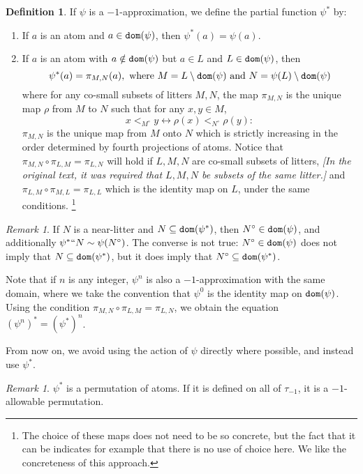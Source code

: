 \documentclass[112pt]{article}
\theoremstyle{definition}
\newtheorem{definition}[theorem]{Definition}
\theoremstyle{remark}
\newtheorem{remark}[theorem]{Remark}
\newcommand{\rk}[1]{{\color{blue}\sl #1}}
\begin{document}
\begin{definition}
  If $\psi$ is a $-1$-approximation, we define the partial function $\psi^*$ by:
  \begin{enumerate}
    \item If $a$ is an atom and $a \in {\tt dom}(\psi)$, then $\psi^*(a) = \psi(a)$.
    \item If $a$ is an atom with $a \notin {\tt dom}(\psi)$ but $a \in L$ and $L \in {\tt dom}(\psi)$, then
    $$ \psi^*(a) = \pi_{M, N}(a),\ \mathrm{where}\ M = L \setminus {\tt dom}(\psi) \ \mathrm{and}\ N = \psi(L) \setminus {\tt dom}(\psi) $$
    where for any co-small subsets of litters $M, N$, the map $\pi_{M,N}$ is the unique map $\rho$ from $M$ to $N$ such that for any $x, y \in M$,
    $$x <_{M^{\circ}} y \leftrightarrow \rho(x) <_{N^\circ} \rho(y):$$
    $\pi_{M,N}$ is the unique map from $M$ onto $N$ which is strictly increasing in the order determined by fourth projections of atoms.  Notice that $ \pi_{M,N} \circ \pi_{L,M} = \pi_{L,N}$ will hold if $L,M,N$ are co-small subsets of litters, \rk{[In the original text, it was required that $L,M,N$ be subsets of the same litter.]} and $\pi_{L,M} \circ \pi_{M,L} = \pi_{L,L}$ which is the identity map on $L$, under the same conditions.%
    \footnote{The choice of these maps does not need to be so concrete, but the fact that it can be indicates for example that there is no use of choice here.  We like the concreteness of this approach.}
  \end{enumerate}
\end{definition}
\begin{remark}
  If $N$ is a near-litter and $N \subseteq {\tt dom}(\psi^*)$, then $N^\circ \in {\tt dom}(\psi)$, and additionally $\psi^* `` N \sim \psi(N^\circ)$.
  The converse is not true: $N^\circ \in {\tt dom}(\psi)$ does not imply that $N \subseteq {\tt dom}(\psi^*)$, but it does imply that $N^\circ \subseteq {\tt dom}(\psi^*)$.

  Note that if $n$ is any integer, $\psi^n$ is also a $-1$-approximation with the same domain, where we take the convention that $\psi^0$ is the identity map on ${\tt dom}(\psi)$.
  Using the condition $\pi_{M,N} \circ \pi_{L,M} = \pi_{L,N}$, we obtain the equation $(\psi^n)^* = (\psi^*)^n$.
\end{remark}
From now on, we avoid using the action of $\psi$ directly where possible, and instead use $\psi^*$.
\begin{remark}\label{rk:minus_one_approx_allowable}
  $\psi^*$ is a permutation of atoms.
  If it is defined on all of $\tau_{-1}$, it is a $-1$-allowable permutation.
\end{remark}
\end{document}
